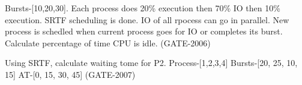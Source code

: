 \begin{minipage}{\linewidth}

  \question  Bursts-[10,20,30]. Each process does 20\% execution then 70\% IO then 10\% execution.
             SRTF scheduling is done. IO of all rpocess can go in parallel. New process is
             schedled when current process goes for IO or completes its burst.
             Calculate percentage of time CPU is idle. (GATE-2006)

  \begin{choices}
  \end{choices}

  \end{minipage}

\vspace{0.08in}



\begin{minipage}{\linewidth}

  \question Using SRTF, calculate waiting tome for P2.
            Process-[1,2,3,4] Bursts-[20, 25, 10, 15] AT-[0, 15, 30, 45] (GATE-2007)

  \begin{choices}
  \end{choices}

  \end{minipage}

\vspace{0.08in}


\begin{comment}


\begin{minipage}{\linewidth}

  \question  (GATE- )

  \begin{choices}
    \choice
    \choice
    \choice
    \choice
  \end{choices}

  \end{minipage}

\vspace{0.08in}



\end{comment}
